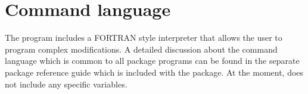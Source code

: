 
\section{Command language}

The program includes a FORTRAN style interpreter that allows the
user to program complex modifications. A detailed discussion about the 
command language which is common to all \Discus package programs can be 
found in the separate \Discus package reference guide which is included with 
the package. At the moment, \Suite does not include any specific
variables.

